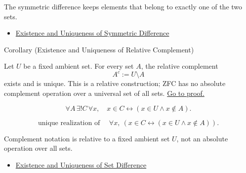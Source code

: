 \begin{remark*}[Interpretation]
The symmetric difference keeps elements that belong to exactly one of the two
sets.
\end{remark*}

\begin{dependencies}
\begin{itemize}
  \item \hyperref[cor:symmetric-difference-exists-unique]{Existence and Uniqueness of Symmetric Difference}
\end{itemize}
\end{dependencies}



\begin{corollarybox}{Corollary (Existence and Uniqueness of Relative Complement)}
\begin{corollary}\label{cor:relative-complement-exists-unique}
Let $U$ be a fixed ambient set. For every set $A$, the relative complement
\[
  A^c:=U\setminus A
\]
exists and is unique. This is a relative construction; ZFC has no absolute
complement operation over a universal set of all sets.
\hyperref[prf:relative-complement-exists-unique]{Go to proof.}
\end{corollary}
\end{corollarybox}



\begin{remark*}
\[
  \forall A\,\exists! C\,\forall x,\quad
  x\in C\leftrightarrow(x\in U\wedge x\notin A).
\]
\end{remark*}

\begin{remark*}
\[
  \text{unique realization of }\quad
  \forall x,\ (x\in C\leftrightarrow(x\in U\wedge x\notin A)).
\]
\end{remark*}

\begin{remark*}[Interpretation]
Complement notation is relative to a fixed ambient set \(U\), not an absolute
operation over all sets.
\end{remark*}

\begin{dependencies}
\begin{itemize}
  \item \hyperref[cor:set-difference-exists-unique]{Existence and Uniqueness of Set Difference}
\end{itemize}
\end{dependencies}

